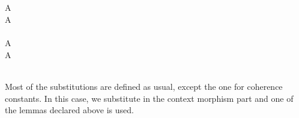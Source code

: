 \documentclass{acm_proc_article-sp}
\begin{document}
{\begin{code}
\\
%
\\
%
\\
\> \AgdaSymbol{:}    \AgdaSymbol{:} \AgdaSymbol{\}\{} \AgdaSymbol{:}   \AgdaSymbol{\}\{} \AgdaSymbol{:}   \AgdaSymbol{\}\{} \AgdaSymbol{:}   \AgdaSymbol{\}\{} \AgdaSymbol{:}  \AgdaSymbol{\}}\<%
\\
\>[0]\<[7]%
\>[7]     \<%
\\
\>[0]\<[7]%
\>[7]   \AgdaSymbol{(}  \AgdaSymbol{)}    \<%
\\
\>  \AgdaSymbol{=}   \AgdaSymbol{(}      \AgdaSymbol{\_)} \AgdaSymbol{)}\<%
\\
%
\\
%
\\
\> \AgdaSymbol{\{}A \AgdaSymbol{=} \AgdaInductiveConstructor{*}\AgdaSymbol{\}} \AgdaSymbol{=} \<%
\\
\> \AgdaSymbol{\{}A \AgdaSymbol{=}  \AgdaSymbol{\{}\AgdaSymbol{\}}  \AgdaSymbol{\}} \AgdaSymbol{=}  \AgdaSymbol{(} \AgdaSymbol{\_)} \AgdaSymbol{(} \AgdaSymbol{\_)} \<[51]%
\>[51]\<%
\\
%
\\
\> \AgdaSymbol{\{}A \AgdaSymbol{=} \AgdaInductiveConstructor{*}\AgdaSymbol{\}} \AgdaSymbol{=} \<%
\\
\> \AgdaSymbol{\{}A \AgdaSymbol{=}  \AgdaSymbol{\{}\AgdaSymbol{\}}  \AgdaSymbol{\}} \AgdaSymbol{=}  \<[34]%
\>[34]\AgdaSymbol{(} \AgdaSymbol{\_)} \AgdaSymbol{(} \AgdaSymbol{\_)}\<%
\\
%
\\
\>\<\end{code}
}
Most of the substitutions are defined as usual, except the one for coherence constants. In this case, we substitute in the context morphism part and one of the lemmas declared above is used.
\end{document}
